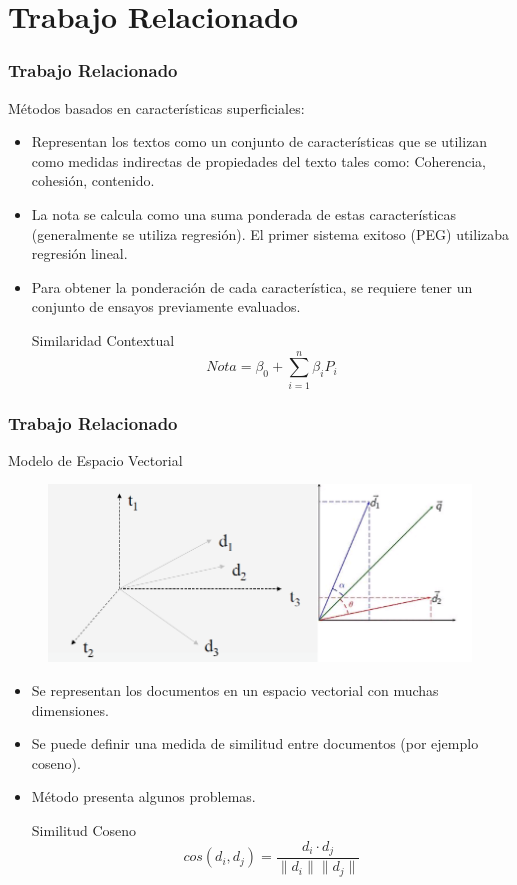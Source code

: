 \documentclass{beamer}
\begin{document}
\section{Trabajo Relacionado}
\begin{frame}
\frametitle{Trabajo Relacionado}
Métodos basados en características superficiales:

\begin{itemize}
\item Representan los textos como un conjunto de características que se utilizan como medidas indirectas de propiedades del texto tales como: Coherencia, cohesión, contenido.
\item La nota se calcula como una suma ponderada de estas características (generalmente se utiliza regresión). El primer sistema exitoso (PEG) utilizaba regresión lineal.
\item Para obtener la ponderación de cada característica, se requiere tener un conjunto de ensayos previamente evaluados.
\begin{block}{Similaridad Contextual}
\begin{equation}
	Nota = \beta_0 + \sum_{i=1}^n \beta_i P_i
\end{equation}
\end{block}


\end{itemize}

\end{frame}


\begingroup
\small
\begin{frame}
\frametitle{Trabajo Relacionado}
Modelo de Espacio Vectorial

\begin{figure}
\includegraphics[width=0.4\linewidth]{fig1.png}
\end{figure}

\begin{itemize}
\item Se representan los documentos en un espacio vectorial con muchas dimensiones.
\item Se puede definir una medida de similitud entre documentos (por ejemplo coseno).
\item Método presenta algunos problemas.
\begin{block}{Similitud Coseno}
\begin{equation}
	cos(d_i, d_j) = \frac{d_i \cdot d_j}{\|d_i\| \|d_j\|}
\end{equation}
\end{block}

\end{itemize}

\end{frame}
\endgroup
\end{document}
